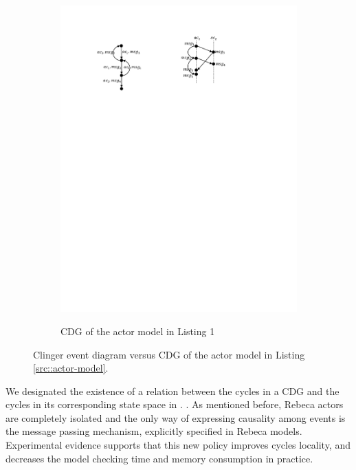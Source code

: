 \begin{figure}
\begin{subfigure}[b]{0.2\textwidth}
  \centering
  \small{
   \includegraphics[width=.8\textwidth]{resources/cdg.pdf}
  }
  \caption{CDG of the actor model in Listing 1}
  \label{fig::cdg}
\end{subfigure}
\caption{Clinger event diagram versus CDG of the actor model in Listing \ref{src::actor-model}.}
\label{fig::clinger-cdg}
\end{figure}

We designated the existence of a relation between the cycles in a CDG and the cycles in its corresponding state space in \cite{DBLP:journals/eceasst/KhamespanahSMSR15}. . 
As mentioned before, Rebeca actors are completely isolated and the only way of expressing causality among events is the message passing mechanism, explicitly specified in Rebeca models. Experimental evidence supports that this new policy improves cycles locality, and decreases the model checking time and memory consumption in practice.